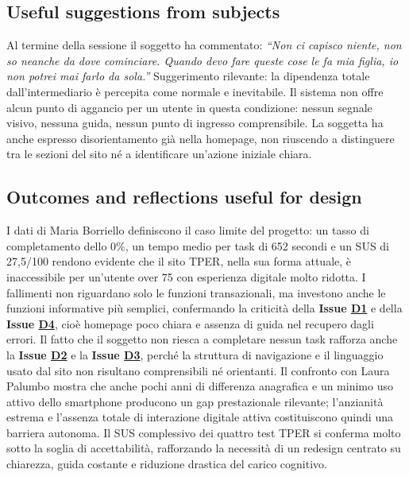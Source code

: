﻿\documentclass[11pt,a4paper]{article}
\begin{document}
\subsection*{Useful suggestions from subjects}
\begin{tcolorbox}[base]
Al termine della sessione il soggetto ha commentato:
\textit{``Non ci capisco niente, non so neanche da dove
cominciare. Quando devo fare queste cose le fa mia figlia,
io non potrei mai farlo da sola.''}
Suggerimento rilevante: la dipendenza totale dall'intermediario
è percepita come normale e inevitabile. Il sistema non offre
alcun punto di aggancio per un utente in questa condizione:
nessun segnale visivo, nessuna guida, nessun punto di
ingresso comprensibile. La soggetta ha anche espresso
disorientamento già nella homepage, non riuscendo a
distinguere tra le sezioni del sito né a identificare
un'azione iniziale chiara.
\end{tcolorbox}
\subsection*{Outcomes and reflections useful for design}
\begin{tcolorbox}[base]
I dati di Maria Borriello definiscono il caso limite del progetto: un tasso di completamento dello 0\%, un tempo medio per task di 652 secondi e un SUS di 27,5/100 rendono evidente che il sito TPER, nella sua forma attuale, è inaccessibile per un'utente over 75 con esperienza digitale molto ridotta. I fallimenti non riguardano solo le funzioni transazionali, ma investono anche le funzioni informative più semplici, confermando la criticità della \textbf{Issue \hyperref[iss:D1]{D1}} e della \textbf{Issue \hyperref[iss:D4]{D4}}, cioè homepage poco chiara e assenza di guida nel recupero dagli errori. Il fatto che il soggetto non riesca a completare nessun task rafforza anche la \textbf{Issue \hyperref[iss:D2]{D2}} e la \textbf{Issue \hyperref[iss:D3]{D3}}, perché la struttura di navigazione e il linguaggio usato dal sito non risultano comprensibili né orientanti. Il confronto con Laura Palumbo mostra che anche pochi anni di differenza anagrafica e un minimo uso attivo dello smartphone producono un gap prestazionale rilevante; l'anzianità estrema e l'assenza totale di interazione digitale attiva costituiscono quindi una barriera autonoma. Il SUS complessivo dei quattro test TPER si conferma molto sotto la soglia di accettabilità, rafforzando la necessità di un redesign centrato su chiarezza, guida costante e riduzione drastica del carico cognitivo.
\end{tcolorbox}
\newpage
\end{document}
